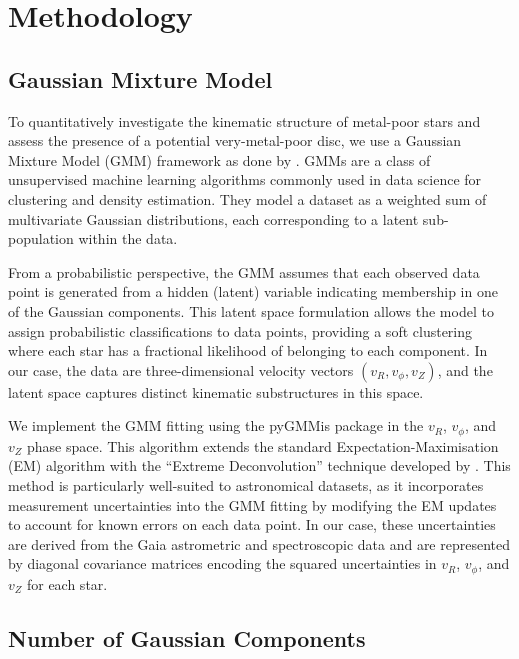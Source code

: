 \documentclass[a4paper,12pt]{article}
\begin{document}
\section{Methodology}

\subsection{Gaussian Mixture Model}

To quantitatively investigate the kinematic structure of metal-poor stars and assess 
the presence of a potential very-metal-poor disc, we use a Gaussian Mixture Model (GMM) framework
 as done by \citet{zhang2024existencemetalpoordiscmilky}. 
GMMs are a class of unsupervised machine learning algorithms commonly used in data science 
for clustering and density estimation. They model a dataset as a weighted sum of multivariate 
Gaussian distributions, each corresponding to a latent sub-population within the data.

From a probabilistic perspective, the GMM assumes that each observed data point is generated from a 
hidden (latent) variable indicating membership in one of the Gaussian components. This latent space 
formulation allows the model to assign probabilistic classifications to data points, providing a 
soft clustering where each star has a fractional likelihood of belonging to each component. In our case, 
the data are three-dimensional velocity vectors $(v_R, v_\phi, v_Z)$, and the latent space captures 
distinct kinematic substructures in this space.

We implement the GMM fitting using the pyGMMis package \citep{pygmmis} in the $v_R$, $v_\phi$, and $v_Z$
phase space. This algorithm extends the standard 
Expectation-Maximisation (EM) algorithm with the ``Extreme Deconvolution'' technique developed by 
\citet{Bovy2011}. This method is particularly well-suited to astronomical datasets, as it incorporates 
measurement uncertainties into the GMM fitting by modifying the EM updates to account for known errors 
on each data point. In our case, these uncertainties are derived from the Gaia astrometric and 
spectroscopic data and are represented by diagonal covariance matrices encoding the squared uncertainties 
in $v_R$, $v_\phi$, and $v_Z$ for each star.


\subsection{Number of Gaussian Components}
\label{subsec:n_components}
\end{document}
